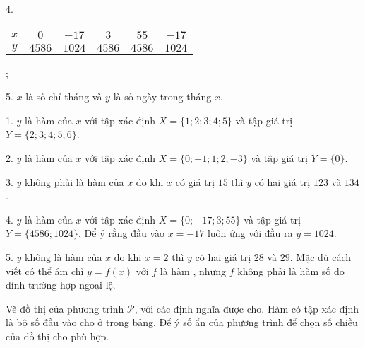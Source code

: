 4.
\begin{tabular}{|c|c|c|c|c|c|}
   \hline
   $x$ & $0$ & $-17$ & $3$ & $55$ & $-17$ \\
   \hline
   $y$ & $4586$ & $1024$ & $4586$ & $4586$ & $1024$ \\
   \hline
\end{tabular};

5. $x$ là số chỉ tháng và $y$ là số ngày trong tháng $x$.

\solution

1. $y$ là hàm của $x$ với tập xác định $X = \{1; 2; 3; 4; 5\}$ và tập giá trị $Y = \{2; 3; 4; 5; 6\}$.

2. $y$ là hàm của $x$ với tập xác định $X = \{0; -1; 1; 2; -3\}$ và tập giá trị $Y = \{0\}$.

3. $y$ không phải là hàm của $x$ do khi $x$ có giá trị $15$ thì $y$ có hai giá trị $123$ và $134$.

4. $y$ là hàm của $x$ với tập xác định $X = \{0; -17; 3; 55\}$ và tập giá trị $Y = \{4586; 1024\}$. Để ý rằng đầu vào $x=-17$ luôn ứng với đầu ra $y = 1024$.

5. $y$ không là hàm của $x$ do khi $x = 2$ thì $y$ có hai giá trị $28$ và $29$. Mặc dù cách viết có thể ám chỉ $y=f(x)$ với $f$ là hàm , nhưng $f$ không phải là hàm số do dính trường hợp ngoại lệ.

\exercise[intropt] Vẽ đồ thị của phương trình $\mathcal{P}$, với các định nghĩa được cho. Hàm có tập xác định là bộ số đầu vào cho ở trong bảng. Để ý số ẩn của phương trình để chọn số chiều của đồ thị cho phù hợp.

